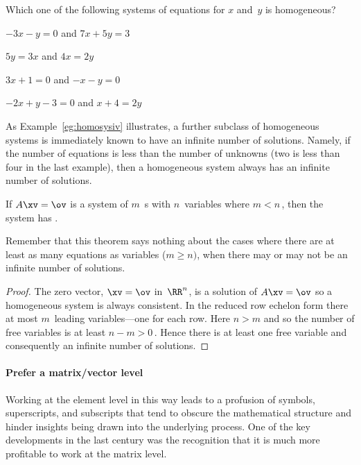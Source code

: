 \begin{activity}
Which one of the following systems of equations for \(x\) and~\(y\) is homogeneous?
\begin{parts}
\item \(-3x-y=0\) and \(7x+5y=3\)
\item \(5y=3x\) and \(4x=2y\)%
\item \(3x+1=0\) and \(-x-y=0\)
\item \(-2x+y-3=0\) and \(x+4=2y\)
\end{parts}
\end{activity}





As Example~\ref{eg:homosysiv} illustrates, a further subclass of homogeneous systems is immediately known to have an infinite number of solutions.
Namely, if the number of equations is less than the number of unknowns (two is less than four in the last example), then a homogeneous system always has an infinite number of solutions.


\begin{theorem} \label{thm:feweqns} 
If \(A\xv=\ov\) is a  system of \(m\)~s with \(n\)~variables where \(m<n\)\,, then the system has .
\end{theorem}

Remember that this theorem says nothing about the cases where there are at least as many equations as variables (\(m\geq n)\), when there may or may not be an infinite number of solutions.

\begin{proof} 
The zero vector, \(\xv=\ov\) in~\(\RR^n\), is a solution of \(A\xv=\ov\) so a homogeneous system is always consistent.
In the reduced row echelon form there at most \(m\)~leading variables---one for each row.
Here \(n>m\) and so the number of free variables is at least \(n-m>0\)\,.
Hence there is at least one free variable and consequently an infinite number of solutions.
\end{proof}




\paragraph{Prefer a matrix/vector level}
\begin{quoted}{\cite[\S2]{Higham2015b}}
Working at the element level in this way leads to a profusion of symbols, superscripts, and subscripts that tend to obscure the mathematical structure and hinder insights being drawn into the underlying process.
One of the key developments in the last century was the recognition that it is much more profitable to work at the matrix level.
\end{quoted}

